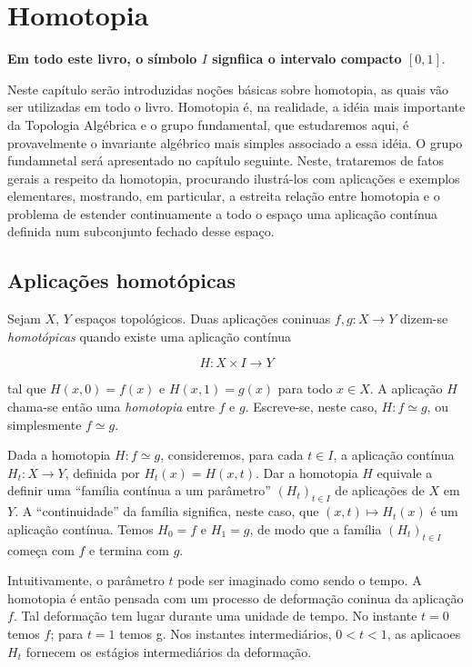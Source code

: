 \chapter{Homotopia}

\textbf{Em todo este livro, o símbolo $I$ signfiica o intervalo
compacto $[0,1]$}.

Neste capítulo serão introduzidas noções básicas sobre homotopia, as
quais vão ser utilizadas em todo o livro. Homotopia é, na realidade, a
idéia mais importante da Topologia Algébrica e o grupo fundamental,
que estudaremos aqui, é provavelmente o invariante algébrico mais
simples associado a essa idéia. O grupo fundamnetal será apresentado
no capítulo seguinte. Neste, trataremos de fatos gerais a respeito da
homotopia, procurando ilustrá-los com aplicações e exemplos
elementares, mostrando, em particular, a estreita relação entre
homotopia e o problema de estender continuamente a todo o espaço uma
aplicação contínua definida num subconjunto fechado desse espaço.

\section{Aplicações homotópicas}

Sejam $X$, $Y$ espaços topológicos. Duas aplicações coninuas $f, g
\colon X \to Y$ dizem-se \textit{homotópicas} quando existe uma
aplicação contínua

\begin{equation*}
	H \colon X \times I \to Y
\end{equation*}

tal que $H(x, 0) = f(x)$ e $H(x, 1) = g(x)$ para todo $x \in X$. A
aplicação $H$ chama-se então uma \textit{homotopia} entre $f$ e $g$.
Escreve-se, neste caso, $H \colon f \simeq g$, ou simplesmente $f
\simeq g$.

Dada a homotopia $H \colon f \simeq g$, consideremos, para cada $t \in
I$, a aplicação contínua $H_{t} \colon X \to Y$, definida por
$H_t(x) = H(x, t)$. Dar a homotopia $H$ equivale a definir uma
``família contínua a um parâmetro'' $(H_t)_{t \in I}$ de aplicações
de $X$ em $Y$. A ``continuidade'' da família significa, neste caso,
que $(x, t) \mapsto H_t(x)$ é um aplicação contínua. Temos $H_0 = f$
e $H_1 = g$, de modo que a família $(H_t)_{t \in I}$ começa com $f$ e
termina com $g$.

Intuitivamente, o parâmetro $t$ pode ser imaginado como sendo o tempo.
A homotopia é então pensada com um processo de deformação coninua da
aplicação $f$. Tal deformação tem lugar durante uma unidade de tempo.
No instante $t=0$ temos $f$; para $t=1$ temos g. Nos instantes
intermediários, $0<t<1$, as aplicaoes $H_t$ fornecem os estágios
intermediários da deformação.

